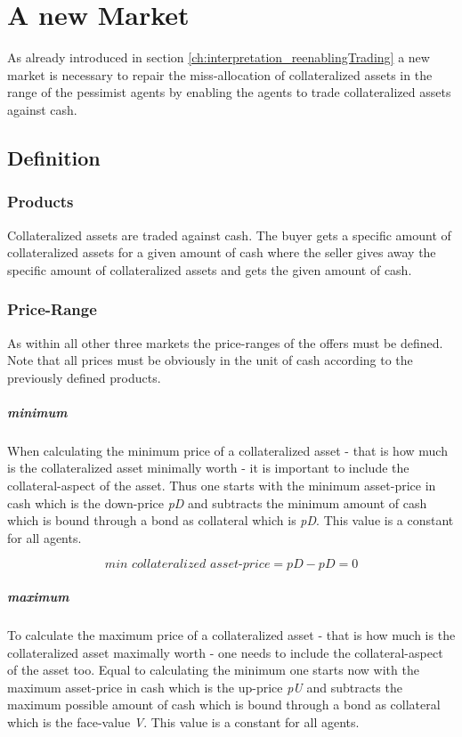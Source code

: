 \documentclass[Bachelorarbeit.tex]{subfiles}
\begin{document}
\graphicspath{{./figures/newMarket/}}	%

\chapter{A new Market}
\label{ch:newMarket}
As already introduced in section \ref{ch:interpretation_reenablingTrading} a new market is necessary to repair the miss-allocation of collateralized assets in the range of the pessimist agents by enabling the agents to trade collateralized assets against cash.

\section{Definition}
\subsection{Products}
Collateralized assets are traded against cash. The buyer gets a specific amount of collateralized assets for a given amount of cash where the seller gives away the specific amount of collateralized assets and gets the given amount of cash.

\subsection{Price-Range}
As within all other three markets the price-ranges of the offers must be defined. Note that all prices must be obviously in the unit of cash according to the previously defined products.

\paragraph{minimum}
When calculating the minimum price of a collateralized asset - that is how much is the collateralized asset minimally worth - it is important to include the collateral-aspect of the asset. Thus one starts with the minimum asset-price in cash which is the down-price \textit{pD} and subtracts the minimum amount of cash which is bound through a bond as collateral which is \textit{pD}. This value is a constant for all agents.

\begin{equation}
\textit{min collateralized asset-price} = \textit{pD} - \textit{pD} = 0
\end{equation}
 
\paragraph{maximum}
To calculate the maximum price of a collateralized asset - that is how much is the collateralized asset maximally worth - one needs to include the collateral-aspect of the asset too. Equal to calculating the minimum one starts now with the maximum asset-price in cash which is the up-price \textit{pU} and subtracts the maximum possible amount of cash which is bound through a bond as collateral which is the face-value \textit{V}. This value is a constant for all agents.
\end{document}
